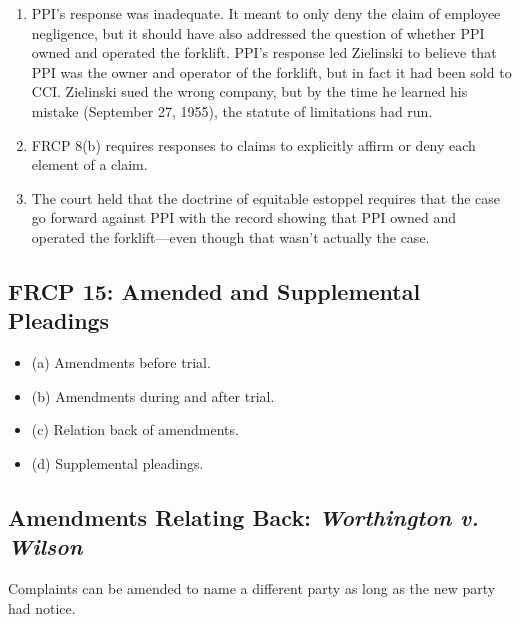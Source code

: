 \begin{enumerate}
\begin{enumerate}
        forklift and that Johnson was an employee of PPI. Initially, PPI 
        simply responded, ``Defendant~.~.~.~denies the averments of paragraph 
        5.''\footnote{Casebook p. 686.}
        \item PPI's response was inadequate. It meant to only deny the claim 
        of employee negligence, but it should have also addressed the question 
        of whether PPI owned and operated the forklift. PPI's response led 
        Zielinski to believe that PPI was the owner and operator of the 
        forklift, but in fact it had been sold to CCI. Zielinski sued the 
        wrong company, but by the time he learned his mistake (September 27, 
        1955), the statute of limitations had run.
        \item FRCP 8(b) requires responses to claims to explicitly affirm or 
        deny each element of a claim.
        \item The court held that the doctrine of equitable estoppel requires 
        that the case go forward against PPI with the record showing that PPI 
        owned and operated the forklift---even though that wasn't actually the 
        case.
    \end{enumerate}
\end{enumerate}

\subsection{FRCP 15: Amended and Supplemental Pleadings}

\begin{itemize}
    \item (a) Amendments before trial.
    \item (b) Amendments during and after trial.
    \item (c) Relation back of amendments.
    \item (d) Supplemental pleadings.
\end{itemize}

\subsection{Amendments Relating Back: \emph{Worthington v. Wilson}}

Complaints can be amended to name a different party as long as the new party 
had notice.

